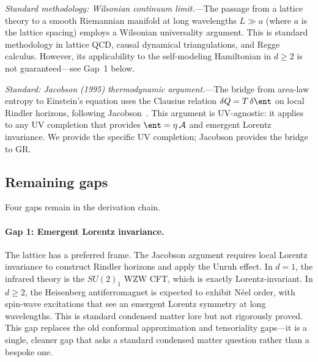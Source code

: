 \emph{Standard methodology: Wilsonian continuum limit.}---The passage
from a lattice theory to a smooth Riemannian manifold at long wavelengths
$L \gg a$ (where $a$ is the lattice spacing) employs a Wilsonian
universality argument.  This is standard methodology in lattice QCD,
causal dynamical triangulations, and Regge calculus.  However, its
applicability to the self-modeling Hamiltonian in $d \geq 2$ is not
guaranteed---see Gap~1 below.

\emph{Standard: Jacobson (1995) thermodynamic argument.}---The bridge
from area-law entropy to Einstein's equation uses the Clausius relation
$\delta Q = T\,\delta\ent$ on local Rindler horizons, following
Jacobson~\cite{Jacobson1995}.  This argument is UV-agnostic: it applies
to any UV completion that provides $\ent = \eta\,\mathcal{A}$ and
emergent Lorentz invariance.  We provide the specific UV completion;
Jacobson provides the bridge to GR.

\subsection{Remaining gaps}
\label{sec:gaps}

Four gaps remain in the derivation chain.

\paragraph{Gap 1: Emergent Lorentz invariance.}
The lattice has a preferred frame.  The Jacobson argument requires local
Lorentz invariance to construct Rindler horizons and apply the Unruh
effect.  In $d = 1$, the infrared theory is the $SU(2)_1$ WZW CFT,
which is exactly Lorentz-invariant.  In $d \geq 2$, the Heisenberg
antiferromagnet is expected to exhibit N\'eel order, with spin-wave
excitations that see an emergent Lorentz symmetry at long wavelengths.
This is standard condensed matter lore but not rigorously proved.
This gap replaces the old conformal approximation and tensoriality
gaps---it is a single, cleaner gap that asks a standard condensed matter
question rather than a bespoke one.

